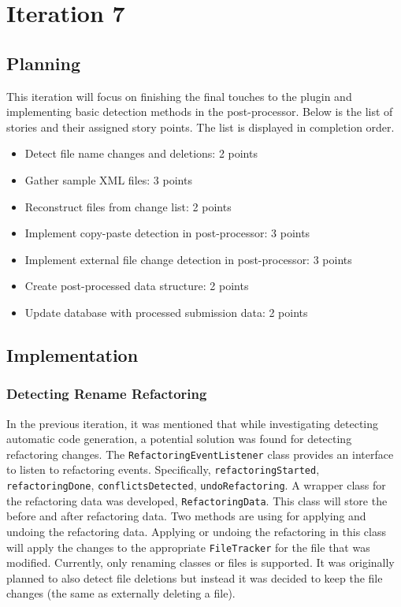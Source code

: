 \chapter{Iteration 7}
\section{Planning}
This iteration will focus on finishing the final touches to the plugin and implementing basic detection methods in the post-processor. Below is the list of stories and their assigned story points. The list is displayed in completion order.

\begin{itemize}
\item Detect file name changes and deletions: 2 points
\item Gather sample XML files: 3 points
\item Reconstruct files from change list: 2 points
\item Implement copy-paste detection in post-processor: 3 points
\item Implement external file change detection in post-processor: 3 points
\item Create post-processed data structure: 2 points
\item Update database with processed submission data: 2 points
\end{itemize}

\section{Implementation}
\subsection{Detecting Rename Refactoring}
In the previous iteration, it was mentioned that while investigating detecting automatic code generation, a potential solution was found for detecting refactoring changes.  The \texttt{RefactoringEventListener} class provides an interface to listen to refactoring events. Specifically, \texttt{refactoringStarted}, \texttt{refactoringDone}, \texttt{conflictsDetected}, \texttt{undoRefactoring}. A wrapper class for the refactoring data was developed, \texttt{RefactoringData}. This class will store the before and after refactoring data. Two methods are using for applying and undoing the refactoring data. Applying or undoing the refactoring in this class will apply the changes to the appropriate \texttt{FileTracker} for the file that was modified. Currently, only renaming classes or files is supported. It was originally planned to also detect file deletions but instead it was decided to keep the file changes (the same as externally deleting a file).

